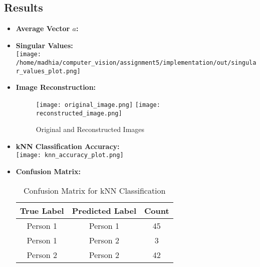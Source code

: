 \documentclass{article}
\begin{document}
\subsection{Results}
    \begin{itemize}
        \item \textbf{Average Vector \( a \):} \\
        [ 88.996  61.056  49.296 ... 100.9    90.824  86.652]

        \item \textbf{Singular Values:} \\
        \texttt{[image: /home/madhia/computer\_vision/assignment5/implementation/out/singular\_values\_plot.png]} %

        \item \textbf{Image Reconstruction:} \\
        \begin{figure}[h]
            \centering
            \texttt{[image: original\_image.png]} %
            \texttt{[image: reconstructed\_image.png]} %
            \caption{Original and Reconstructed Images}
        \end{figure}

        \item \textbf{kNN Classification Accuracy:} \\
        \texttt{[image: knn\_accuracy\_plot.png]} %

        \item \textbf{Confusion Matrix:} \\
        \begin{table}[h]
            \centering
            \begin{tabular}{@{}ccc@{}}
                \toprule
                True Label & Predicted Label & Count \\ \midrule
                Person 1   & Person 1       & 45   \\
                Person 1   & Person 2       & 3    \\
                Person 2   & Person 2       & 42   \\
                \bottomrule
            \end{tabular}
            \caption{Confusion Matrix for kNN Classification}
        \end{table}
    \end{itemize}
\end{document}

